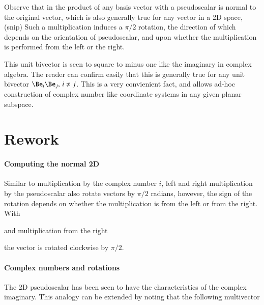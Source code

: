 Observe that in  the product of any basis vector with a pseudoscalar is normal to the original vector, which is also generally true for any vector in a 2D space,
(snip)
Such a multiplication induces a \( \pi/2 \) rotation, the direction of which depends on the orientation of pseudoscalar, and upon whether the multiplication is performed from the left or the right.

This unit bivector is seen to square to minus one like the imaginary in complex algebra.
The reader can confirm easily that this is generally true for any unit bivector \( \Be_i \Be_j, \, i \ne j \).
This is a very convienient fact, and allows ad-hoc construction of complex number like coordinate systems in any given planar subspace.

\section{Rework}
\paragraph{Computing the normal 2D}

Similar to multiplication by the complex number \( i \),
left and right multiplication by the pseudoscalar also rotate vectors by \( \pi/2 \) radians, however, the sign of the rotation depends on whether the multiplication is from the left or from the right.
With

and multiplication from the right

the vector is rotated clockwise by \( \pi/2 \).
%
\paragraph{Complex numbers and rotations}

The 2D pseudoscalar has been seen to have the characteristics of the complex imaginary.
This analogy can be extended by noting that the following multivector

